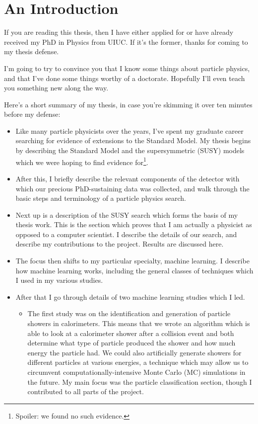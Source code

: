 \chapter*{An Introduction}

If you are reading this thesis, then I have either applied for or have  already received my PhD in Physics from UIUC. If it's the former, thanks for coming to my thesis defense.

I'm going to try to convince you that I know some things about particle physics, and that I've done some things worthy of a doctorate. Hopefully I'll even teach you something new along the way.

Here's a short summary of my thesis, in case you're skimming it over ten minutes before my defense:

\begin{itemize}

    \item Like many particle physicists over the years, I've spent my graduate career searching for evidence of extensions to the Standard Model. My thesis begins by describing the Standard Model and the supersymmetric (SUSY) models which we were hoping to find evidence for\footnote{Spoiler: we found no such evidence.}.
    
    \item After this, I briefly describe the relevant components of the detector with which our precious PhD-sustaining data was collected, and walk through the basic steps and terminology of a particle physics search.
    
    \item Next up is a description of the SUSY search which forms the basis of my thesis work. This is the section which proves that I am actually a physicist as opposed to a computer scientist. I describe the details of our search, and describe my contributions to the project. Results are discussed here.

    \item The focus then shifts to my particular specialty, machine learning. I describe how machine learning works, including the general classes of techniques which I used in my various studies.
    
    \item After that I go through details of two machine learning studies which I led.
    
    \begin{itemize}
    
        \item The first study was on the identification and generation of particle showers in calorimeters. This means that we wrote an algorithm which is able to look at a calorimeter shower after a collision event and both determine what type of particle produced the shower and how much energy the particle had. We could also artificially generate showers for different particles at various energies, a technique which may allow us to circumvent computationally-intensive Monte Carlo (MC) simulations in the future. My main focus was the particle classification section, though I contributed to all parts of the project.


\end{itemize}
\end{itemize}
